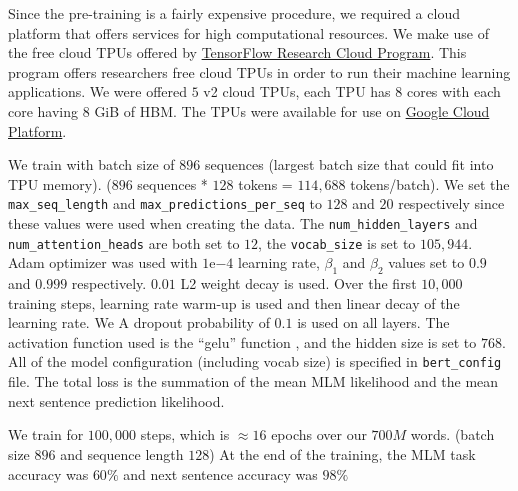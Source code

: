 Since the pre-training is a fairly expensive procedure, we required a cloud platform that offers services for high computational resources. We make use of the free cloud \ac{TPU}s offered by \href{https://www.tensorflow.org/tfrc}{TensorFlow Research Cloud Program}. This program offers researchers free cloud \ac{TPU}s in order to run their machine learning applications. We were offered $5$ v2 cloud \ac{TPU}s, each \ac{TPU} has $8$ cores with each core having $8$ GiB of \ac{HBM}. The \ac{TPU}s were available for use on \href{https://cloud.google.com/}{Google Cloud Platform}.

We train with batch size of $896$ sequences (largest batch size that could fit into \ac{TPU} memory). ($896$ sequences * $128$ tokens = $114,688$ tokens/batch). We set the \texttt{max\_seq\_length} and \texttt{max\_predictions\_per\_seq} to $128$ and $20$ respectively since these values were used when creating the data. The \texttt{num\_hidden\_layers} and \texttt{num\_attention\_heads} are both set to $12$, the \texttt{vocab\_size} is set to $105,944$. Adam optimizer \cite{kingma2014adam} was used with $1\mathrm{e}{-4}$ learning rate, $\beta_1$ and $\beta_2$ values set to $0.9$ and $0.999$ respectively. $0.01$ L2 weight decay is used. Over the first $10,000$ training steps, learning rate warm-up is used and then linear decay of the learning rate.  We A dropout probability of $0.1$ is used on all layers. The activation function used is the \enquote{gelu} function \cite{hendrycks2016bridging}, and the hidden size is set to $768$. All of the model configuration (including vocab size) is specified in \texttt{bert\_config} file. The total loss is the summation of the mean \ac{MLM} likelihood and the mean next sentence prediction likelihood.


We train for $100,000$ steps, which is $\approx 16$ epochs over our $700M$ words. (batch size $896$ and sequence length $128$) At the end of the training, the \ac{MLM} task accuracy was $60\%$ and next sentence accuracy was $98\%$ 


 

